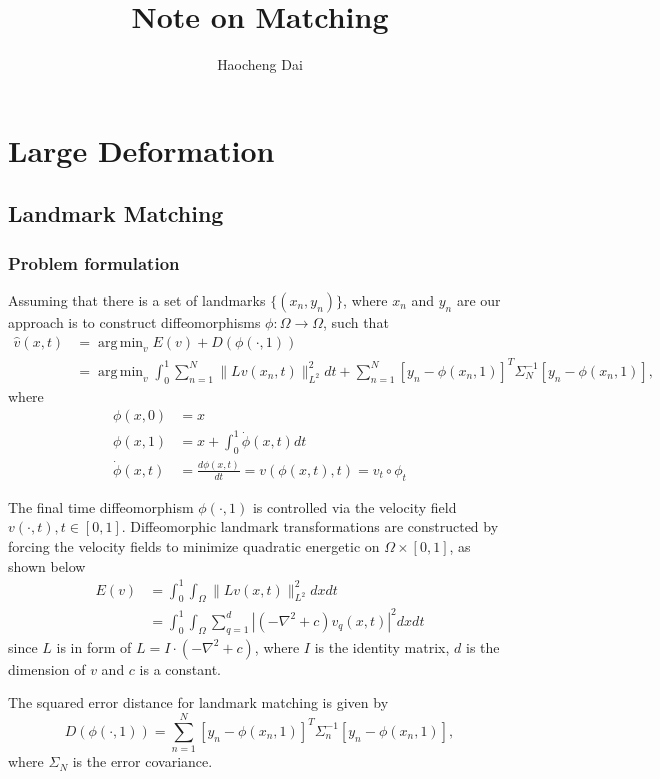 \documentclass{article}
\title{Note on Matching}
\author{Haocheng Dai}
\date{}
\DeclareMathOperator*{\argmin}{arg\,min}
\theoremstyle{definition}
\theoremstyle{plain}
\begin{document}
\maketitle


\section{Large Deformation}
\subsection{Landmark Matching\cite{joshi,miller,johnson}}
\subsubsection{Problem formulation}
Assuming that there is a set of landmarks $\{(x_n,y_n)\}$, where $x_n$ and $y_n$ are  our approach is to construct diffeomorphisms $\phi:\Omega\rightarrow\Omega$, such that
\begin{align}
    \hat{v}(x,t)&=\argmin_vE(v)+D(\phi(\cdot,1))\\ \nonumber
    &=\argmin_v \int^1_0\sum_{n=1}^N\|Lv(x_n,t)\|^2_{L^2}dt+\sum^N_{n=1}[y_n-\phi(x_n,1)]^T\Sigma^{-1}_N[y_n-\phi(x_n,1)],
\end{align}
where
\begin{align*}
    \phi(x,0)&=x\\
    \phi(x,1)&=x+\int^1_0\Dot{\phi}(x,t)dt\\
    \Dot{\phi}(x,t)&=\frac{d\phi(x,t)}{dt}=v(\phi(x,t),t)=v_t\circ\phi_t
\end{align*}

The final time diffeomorphism $\phi(\cdot,1)$ is controlled via the velocity field $v(\cdot,t),t\in[0,1]$. Diffeomorphic landmark transformations are constructed by forcing the velocity fields to minimize quadratic energetic on $\Omega\times[0,1]$, as shown below
\begin{align*}
    E(v)&=\int_0^1\int_\Omega\|Lv(x,t)\|^2_{L^2}dxdt\\
    &=\int_0^1\int_\Omega\sum^{d}_{q=1}|(-\nabla^2+c)v_q(x,t)|^2dxdt
\end{align*} 
since $L$ is in form of $L=I\cdot(-\nabla^2+c)$, where $I$ is the identity matrix, $d$ is the dimension of $v$ and $c$ is a constant.

The squared error distance for landmark matching is given by
\begin{equation*}
    D(\phi(\cdot,1))=\sum^N_{n=1}[y_n-\phi(x_n,1)]^T\Sigma^{-1}_n[y_n-\phi(x_n,1)],
\end{equation*}
where $\Sigma_N$ is the error covariance.
\end{document}
